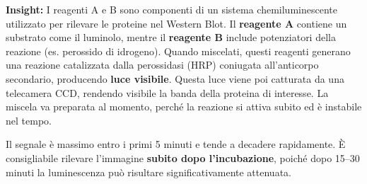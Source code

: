 \begin{insightBox}
	\textbf{Insight:} I reagenti A e B sono componenti di un sistema chemiluminescente utilizzato per rilevare le proteine nel Western Blot. 
	Il \textbf{reagente A} contiene un substrato come il luminolo, mentre il \textbf{reagente B} include potenziatori della reazione (es. perossido di idrogeno). 
	Quando miscelati, questi reagenti generano una reazione catalizzata dalla perossidasi (HRP) coniugata all’anticorpo secondario, producendo \textbf{luce visibile}. 
	Questa luce viene poi catturata da una telecamera CCD, rendendo visibile la banda della proteina di interesse. 
	La miscela va preparata al momento, perché la reazione si attiva subito ed è instabile nel tempo. 
	
	\vspace{0.5em}
  Il segnale è massimo entro i primi 5 minuti e tende a decadere rapidamente. È consigliabile rilevare l’immagine \textbf{subito dopo l’incubazione}, poiché dopo 15–30 minuti la luminescenza può risultare significativamente attenuata.
\end{insightBox}



\newpage

